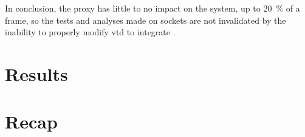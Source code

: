 In conclusion, the proxy has little to no impact on the system, up to \SI{20}{\percent} of a frame, so the tests and analyses made on  sockets are not invalidated by the inability to properly modify \gls{vtd} to integrate .

\section{Results}\label{sc:performance:results}

\section{Recap}\label{sc:performance:recap}
